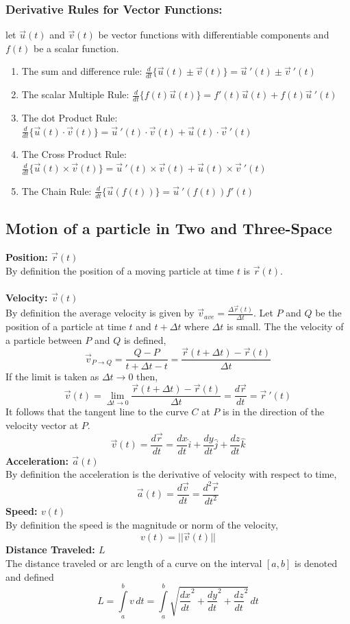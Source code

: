 \documentclass[14pt]{article}
\begin{document}
    \subsubsection{Derivative Rules for Vector Functions:}
    let $\vec u(t)$ and $\vec v (t)$ be vector functions with differentiable components and $f(t)$ be a scalar function.\\
    \begin{enumerate}
        \item The sum and difference rule: $\frac{d}{dt}\bigg\{\vec u(t)\pm \vec v(t)\bigg\}=\vec u\ '(t)\pm\vec v\ '(t)$
        \item The scalar Multiple Rule: $\frac{d}{dt}\bigg\{f(t)\vec u(t)\bigg\}=f'(t)\vec u(t)+f(t)\vec u\ '(t)$
        \item The dot Product Rule: $\frac{d}{dt}\bigg\{\vec u(t)\cdot \vec v(t)\bigg\}=\vec u\ '(t)\cdot \vec v(t)+\vec u(t)\cdot \vec v\ '(t)$
        \item The Cross Product Rule: $\frac{d}{dt}\bigg\{\vec u(t)\times \vec v(t)\bigg\}=\vec u\ '(t)\times \vec v(t)+\vec u(t)\times \vec v\ '(t)$
        \item The Chain Rule: $\frac{d}{dt}\bigg\{\vec u(f(t))\bigg\}=\vec u\ '(f(t))f'(t)$
    \end{enumerate}
    \subsection{Motion of a particle in Two and Three-Space}
    \textbf{Position: $\vec r(t)$}\\
    By definition the position of a moving particle at time $t$ is $\vec r(t)$.\\\\
    \textbf{Velocity: $\vec v(t)$}\\
    By definition the average velocity is given by $\vec v_{ave}=\frac{\Delta\vec r(t)}{\Delta t}$. Let $P$ and $Q$ be the position of a particle at time $t$ and $t+\Delta t$ where $\Delta t$ is small. The the velocity of a particle between $P$ and $Q$ is defined, 
    $$\vec v_{P\rightarrow Q}=\frac{Q-P}{t+\Delta t-t}=\frac{\vec r(t+\Delta t)-\vec r(t)}{\Delta t}$$
    If the limit is taken as $\Delta t\rightarrow 0$ then,
    $$\vec v(t)=\lim\limits_{\Delta t\rightarrow 0}\frac{\vec r(t+\Delta t)-\vec r(t)}{\Delta t}=\frac{d\vec r}{dt}=\vec r\ '(t)$$
    It follows that the tangent line to the curve $C$ at $P$ is in the direction of the velocity vector at $P$.
    $$\vec v(t)=\frac{d\vec r}{dt}= \frac{dx}{dt}\hat i+ \frac{dy}{dt}\hat j +\frac{dz}{dt}\hat k$$
    \textbf{Acceleration: $\vec a(t)$}\\
    By definition the acceleration is the derivative of velocity with respect to time,
    $$\vec a (t)=\frac{d\vec v}{dt}=\frac{d^2\vec r}{dt^2}$$
    \textbf{Speed: $v(t)$}\\
    By definition the speed is the magnitude or norm of the velocity,
    $$v(t)=||\vec v (t)||$$
    \textbf{Distance Traveled: $L$}\\
    The distance traveled or arc length of a curve on the interval $[a,b]$ is denoted and defined
    $$L=\int\limits_a^bv\, dt=\int\limits_a^b\sqrt{\frac{dx}{dt}^2+\frac{dy}{dt}^2+\frac{dz}{dt}^2}\, dt$$
\end{document}
